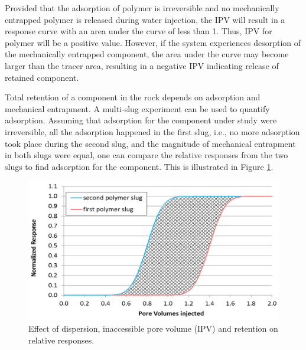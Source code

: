 Provided that the adsorption of polymer is irreversible and no mechanically entrapped polymer is released during water injection, the IPV will result in a response curve with an area under the curve of less than 1. Thus, IPV for polymer will be a positive value. However, if the system experiences desorption of the mechanically entrapped component, the area under the curve may become larger than the tracer area, resulting in a negative IPV indicating release of retained component. 

Total retention of a component in the rock depends on adsorption and mechanical entrapment. A multi-slug experiment can be used to quantify adsorption. Assuming that adsorption for the component under study were irreversible, all the adsorption happened in the first slug, i.e., no more adsorption took place during the second slug, and the magnitude of mechanical entrapment in both slugs were equal, one can compare the relative responses from the two slugs to find adsorption for the component. This is illustrated in Figure \ref{fig:ipvRet3}.

\begin{figure}[h!]
    \centering
    \includegraphics[width=\textwidth]{img/fig/ipvRet3.png}
    \caption{Effect of dispersion, inaccessible pore volume (IPV) and retention on relative responses.}
    \label{fig:ipvRet3} %
\end{figure}